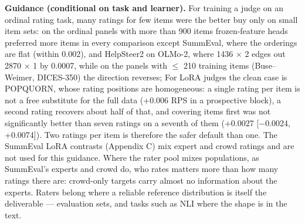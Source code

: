 \documentclass[10pt,twocolumn]{article}
\begin{document}
\textbf{Guidance (conditional on task and learner).} For training a judge on an ordinal rating task, many ratings for few items were the better buy only on small item sets: on the ordinal panels with more than 900 items frozen-feature heads preferred more items in every comparison except SummEval, where the orderings are flat (within 0.002), and HelpSteer2 on OLMo-2, where 1436 $\times$ 2 edges out 2870 $\times$ 1 by 0.0007, while on the panels with $\leq$ 210 training items (Buse--Weimer, DICES-350) the direction reverses; For LoRA judges the clean case is POPQUORN, whose rating positions are homogeneous: a single rating per item is not a free substitute for the full data (+0.006 RPS in a prospective block), a second rating recovers about half of that, and covering items first was not significantly better than seven ratings on a seventh of them (+0.0027 {[}$-$0.0024, +0.0074{]}). Two ratings per item is therefore the safer default than one. The SummEval LoRA contrasts (Appendix C) mix expert and crowd ratings and are not used for this guidance. Where the rater pool mixes populations, as SummEval's experts and crowd do, who rates matters more than how many ratings there are: crowd-only targets carry almost no information about the experts. Raters belong where a reliable reference distribution is itself the deliverable --- evaluation sets, and tasks such as NLI where the shape is in the text.
\end{document}
